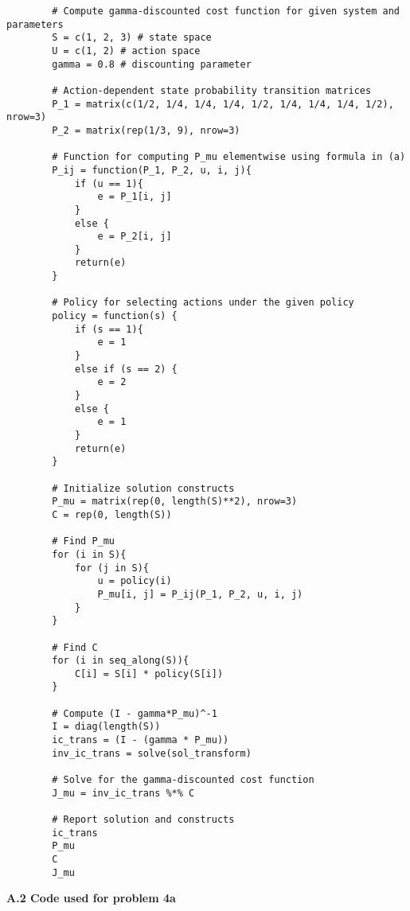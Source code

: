 \documentclass[11pt, letterpaper]{article}
\begin{document}
    \begin{verbatim}
        # Compute gamma-discounted cost function for given system and parameters
        S = c(1, 2, 3) # state space
        U = c(1, 2) # action space
        gamma = 0.8 # discounting parameter

        # Action-dependent state probability transition matrices
        P_1 = matrix(c(1/2, 1/4, 1/4, 1/4, 1/2, 1/4, 1/4, 1/4, 1/2), nrow=3)
        P_2 = matrix(rep(1/3, 9), nrow=3)

        # Function for computing P_mu elementwise using formula in (a)
        P_ij = function(P_1, P_2, u, i, j){
            if (u == 1){
                e = P_1[i, j]
            }
            else {
                e = P_2[i, j]
            }
            return(e)
        }

        # Policy for selecting actions under the given policy
        policy = function(s) {
            if (s == 1){
                e = 1
            }
            else if (s == 2) {
                e = 2
            }
            else {
                e = 1
            }
            return(e)
        }

        # Initialize solution constructs
        P_mu = matrix(rep(0, length(S)**2), nrow=3)
        C = rep(0, length(S))

        # Find P_mu
        for (i in S){
            for (j in S){
                u = policy(i)
                P_mu[i, j] = P_ij(P_1, P_2, u, i, j)
            }
        }

        # Find C
        for (i in seq_along(S)){
            C[i] = S[i] * policy(S[i])
        }

        # Compute (I - gamma*P_mu)^-1
        I = diag(length(S))
        ic_trans = (I - (gamma * P_mu))
        inv_ic_trans = solve(sol_transform)

        # Solve for the gamma-discounted cost function
        J_mu = inv_ic_trans %*% C

        # Report solution and constructs
        ic_trans
        P_mu
        C
        J_mu
    \end{verbatim}
    {\bf A.2 Code used for problem 4a}
\end{document}
